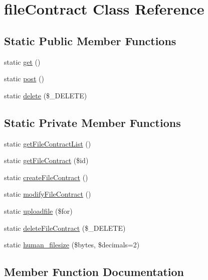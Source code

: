 \hypertarget{a00023}{}\section{file\+Contract Class Reference}
\label{a00023}
\subsection*{Static Public Member Functions}
\begin{DoxyCompactItemize}
\item 
static \hyperlink{a00023_a5ba61361bf0695a285bbaefefc427191}{get} ()
\item 
static \hyperlink{a00023_a68f2acd1041d57bf8faf2da612e202a8}{post} ()
\item 
static \hyperlink{a00023_a598da63ff0199f442adaa4dfb0fe1447}{delete} (\$\+\_\+\+D\+E\+L\+E\+T\+E)
\end{DoxyCompactItemize}
\subsection*{Static Private Member Functions}
\begin{DoxyCompactItemize}
\item 
static \hyperlink{a00023_a6ee760cc2ff8396f6872ea2aa381c970}{get\+File\+Contract\+List} ()
\item 
static \hyperlink{a00023_a0ea4c639102d0fd40b3f5a93f2aaf3b4}{get\+File\+Contract} (\$id)
\item 
static \hyperlink{a00023_a6a978b954271c3719e7edd6311cda159}{create\+File\+Contract} ()
\item 
static \hyperlink{a00023_af2cac22b441b824a3336528fada0144f}{modify\+File\+Contract} ()
\item 
static \hyperlink{a00023_a88dccfeb88796efbe02090e07e755e17}{uploadfile} (\$for)
\item 
static \hyperlink{a00023_a59b1222816aff91a512c82aefb93c0cf}{delete\+File\+Contract} (\$\+\_\+\+D\+E\+L\+E\+T\+E)
\item 
static \hyperlink{a00023_ac3002e2acdec5210ef80cc6814a3cb88}{human\+\_\+filesize} (\$bytes, \$decimals=2)
\end{DoxyCompactItemize}


\subsection{Member Function Documentation}
\hypertarget{a00023_a5ba61361bf0695a285bbaefefc427191}{}
